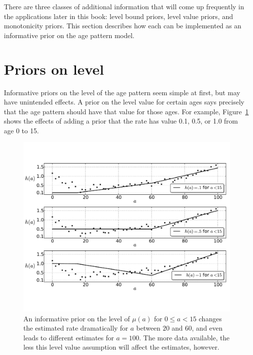 There are three classes of additional information that will come up
frequently in the applications later in this book: level bound priors,
level value priors, and monotonicity priors. This section describes
how each can be implemented as an informative prior on the age pattern
model.


\section{Priors on level}

Informative priors on the level of the age pattern seem simple at
first, but may have unintended effects.  A prior on the level value
for certain ages says precisely that the age pattern should have that
value for those ages.  For example, Figure~\ref{level-value-priors} shows
the effects of adding a prior that the rate has value 0.1, 0.5, or 1.0
from age 0 to 15.


\begin{figure}[h]
\begin{center}
\includegraphics[width=\textwidth]{level_value-smoothing-splines.pdf}
\caption{An informative prior on the level of
$\mu(a)$ for $0 \leq a < 15$ changes the estimated rate dramatically
for $a$ between $20$ and $60$, and even leads to different estimates
for $a = 100$.  The more data available, the less this level value
assumption will affect the estimates, however.
}
\label{level-value-priors}
\end{center}
\end{figure}



